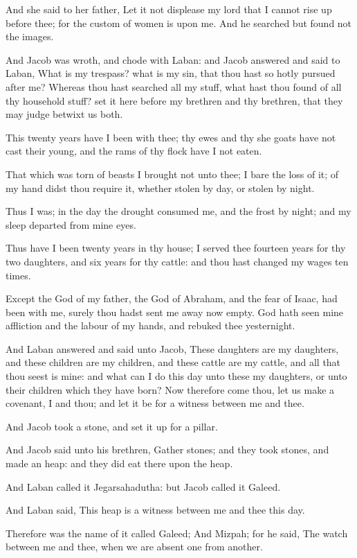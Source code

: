 \verse And she said to her father, Let it not displease my lord that I cannot rise up before thee; for the custom of women is upon me. And he searched but found not the images.

\verse And Jacob was wroth, and chode with Laban: and Jacob answered and said to Laban, What is my trespass? what is my sin, that thou hast so hotly pursued after me?  \verse Whereas thou hast searched all my stuff, what hast thou found of all thy household stuff? set it here before my brethren and thy brethren, that they may judge betwixt us both.

\verse This twenty years have I been with thee; thy ewes and thy she goats have not cast their young, and the rams of thy flock have I not eaten.

\verse That which was torn of beasts I brought not unto thee; I bare the loss of it; of my hand didst thou require it, whether stolen by day, or stolen by night.

\verse Thus I was; in the day the drought consumed me, and the frost by night; and my sleep departed from mine eyes.

\verse Thus have I been twenty years in thy house; I served thee fourteen years for thy two daughters, and six years for thy cattle: and thou hast changed my wages ten times.

\verse Except the God of my father, the God of Abraham, and the fear of Isaac, had been with me, surely thou hadst sent me away now empty. God hath seen mine affliction and the labour of my hands, and rebuked thee yesternight.

\verse And Laban answered and said unto Jacob, These daughters are my daughters, and these children are my children, and these cattle are my cattle, and all that thou seest is mine: and what can I do this day unto these my daughters, or unto their children which they have born?  \verse Now therefore come thou, let us make a covenant, I and thou; and let it be for a witness between me and thee.

\verse And Jacob took a stone, and set it up for a pillar.

\verse And Jacob said unto his brethren, Gather stones; and they took stones, and made an heap: and they did eat there upon the heap.

\verse And Laban called it Jegarsahadutha: but Jacob called it Galeed.

\verse And Laban said, This heap is a witness between me and thee this day.

Therefore was the name of it called Galeed; \verse And Mizpah; for he said, The \LORD watch between me and thee, when we are absent one from another.

